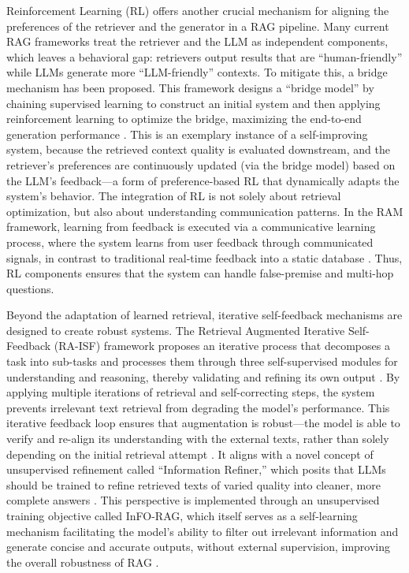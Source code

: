 \documentclass[11pt]{article}
\begin{document}
Reinforcement Learning (RL) offers another crucial mechanism for aligning the preferences of the retriever and the generator in a RAG pipeline. Many current RAG frameworks treat the retriever and the LLM as independent components, which leaves a behavioral gap: retrievers output results that are ``human-friendly'' while LLMs generate more ``LLM-friendly'' contexts. To mitigate this, a bridge mechanism has been proposed. This framework designs a ``bridge model'' by chaining supervised learning to construct an initial system and then applying reinforcement learning to optimize the bridge, maximizing the end-to-end generation performance \cite{ref80}. This is an exemplary instance of a self-improving system, because the retrieved context quality is evaluated downstream, and the retriever's preferences are continuously updated (via the bridge model) based on the LLM's feedback---a form of preference-based RL that dynamically adapts the system's behavior. The integration of RL is not solely about retrieval optimization, but also about understanding communication patterns. In the RAM framework, learning from feedback is executed via a communicative learning process, where the system learns from user feedback through communicated signals, in contrast to traditional real-time feedback into a static database \cite{ref55}. Thus, RL components ensures that the system can handle false-premise and multi-hop questions.

Beyond the adaptation of learned retrieval, iterative self-feedback mechanisms are designed to create robust systems. The Retrieval Augmented Iterative Self-Feedback (RA-ISF) framework proposes an iterative process that decomposes a task into sub-tasks and processes them through three self-supervised modules for understanding and reasoning, thereby validating and refining its own output \cite{ref5}. By applying multiple iterations of retrieval and self-correcting steps, the system prevents irrelevant text retrieval from degrading the model's performance. This iterative feedback loop ensures that augmentation is robust---the model is able to verify and re-align its understanding with the external texts, rather than solely depending on the initial retrieval attempt \cite{ref5}. It aligns with a novel concept of unsupervised refinement called ``Information Refiner,'' which posits that LLMs should be trained to refine retrieved texts of varied quality into cleaner, more complete answers \cite{ref52}. This perspective is implemented through an unsupervised training objective called InFO-RAG, which itself serves as a self-learning mechanism facilitating the model's ability to filter out irrelevant information and generate concise and accurate outputs, without external supervision, improving the overall robustness of RAG \cite{ref52}.
\end{document}
